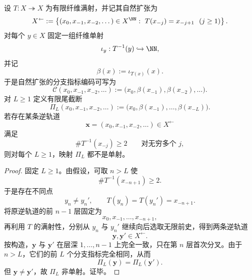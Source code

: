 \begin{theorem}[持续歧义迫使自然扩张需要无限尾寄存器]\label{thm:xi-time-part75a-persistent-ambiguity-forces-infinite-tail}
设 \(T:X\twoheadrightarrow X\) 为有限纤维满射，并记其自然扩张为
\[
X^{\leftarrow}
:=
\left\{
(x_0,x_{-1},x_{-2},\dots)\in X^{\NN}:\ T(x_{-j})=x_{-j+1}\ \ (j\ge 1)
\right\}.
\]
对每个 \(y\in X\) 固定一组纤维单射
\[
\iota_y:T^{-1}(y)\hookrightarrow \NN,
\]
并记
\[
\beta(x):=\iota_{T(x)}(x).
\]
于是自然扩张的分支指标编码可写为
\[
\mathcal C(x_0,x_{-1},x_{-2},\dots)
:=
\bigl(x_0,\beta(x_{-1}),\beta(x_{-2}),\dots\bigr).
\]
对 \(L\ge 1\) 定义有限尾截断
\[
\Pi_L(x_0,x_{-1},x_{-2},\dots)
:=
\bigl(x_0,\beta(x_{-1}),\dots,\beta(x_{-L})\bigr).
\]
若存在某条逆轨道
\[
\mathbf x=(x_0,x_{-1},x_{-2},\dots)\in X^{\leftarrow}
\]
满足
\[
\#T^{-1}(x_{-j})\ge 2
\qquad
\text{对无穷多个 }j,
\]
则对每个 \(L\ge 1\)，映射 \(\Pi_L\) 都不是单射。
\end{theorem}
\begin{proof}
固定 \(L\ge 1\)。由假设，可取 \(n>L\) 使
\[
\#T^{-1}(x_{-n+1})\ge 2.
\]
于是存在不同点
\[
y_n\neq y_n',
\qquad
T(y_n)=T(y_n')=x_{-n+1}.
\]
将原逆轨道的前 \(n-1\) 层固定为
\[
x_0,x_{-1},\dots,x_{-n+1},
\]
再利用 \(T\) 的满射性，分别从 \(y_n\) 与 \(y_n'\) 继续向后选取无限前史，得到两条逆轨道
\[
\mathbf y,\mathbf y'\in X^{\leftarrow}.
\]
按构造，\(\mathbf y\) 与 \(\mathbf y'\) 在层深 \(1,\dots,n-1\) 上完全一致，只在第 \(n\) 层首次分叉。由于 \(n>L\)，它们的前 \(L\) 个分支指标完全相同，从而
\[
\Pi_L(\mathbf y)=\Pi_L(\mathbf y').
\]
但 \(\mathbf y\neq \mathbf y'\)，故 \(\Pi_L\) 非单射。证毕。
\end{proof}


